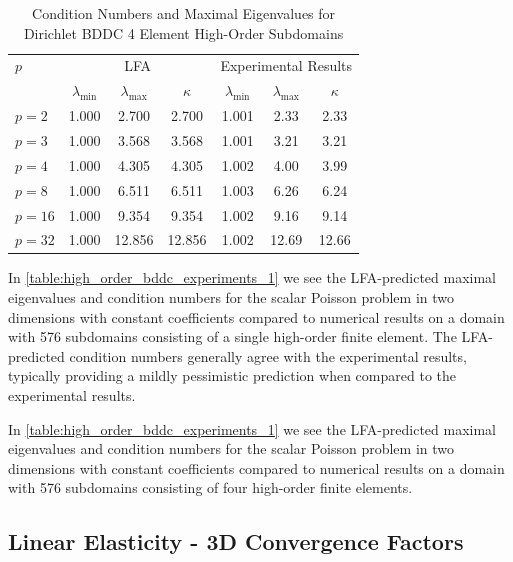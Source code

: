 \documentclass[review]{siamart190516}
\begin{document}
\begin{table}[ht!]
\begin{center}
\begin{tabular}{l ccc ccc}
  \toprule
  $p$  &  \multicolumn{3}{c}{LFA}  &  \multicolumn{3}{c}{Experimental Results}  \\
                      &  $\lambda_{\text{min}}$  &  $\lambda_{\text{max}}$  &  $\kappa$ & $\lambda_{\text{min}}$  &  $\lambda_{\text{max}}$ & $\kappa$  \\
  \toprule
  $p = 2$   &  1.000  &   2.700  &   2.700  &  1.001  &   2.33  &   2.33  \\
  $p = 3$   &  1.000  &   3.568  &   3.568  &  1.001  &   3.21  &   3.21  \\
  $p = 4$   &  1.000  &   4.305  &   4.305  &  1.002  &   4.00  &   3.99  \\
  $p = 8$   &  1.000  &   6.511  &   6.511  &  1.003  &   6.26  &   6.24  \\
  $p = 16$  &  1.000  &   9.354  &   9.354  &  1.002  &   9.16  &   9.14  \\
  $p = 32$  &  1.000  &  12.856  &  12.856  &  1.002  &  12.69  &  12.66  \\
  \bottomrule
\end{tabular}
\end{center}
\caption{Condition Numbers and Maximal Eigenvalues for Dirichlet BDDC 4 Element High-Order Subdomains}
\label{table:high_order_bddc_experiments_2}
\end{table}

In \cref{table:high_order_bddc_experiments_1} we see the LFA-predicted maximal eigenvalues and condition numbers for the scalar Poisson problem in two dimensions with constant coefficients compared to numerical results on a domain with 576 subdomains consisting of a single high-order finite element.
The LFA-predicted condition numbers generally agree with the experimental results, typically providing a mildly pessimistic prediction when compared to the experimental results.

In \cref{table:high_order_bddc_experiments_1} we see the LFA-predicted maximal eigenvalues and condition numbers for the scalar Poisson problem in two dimensions with constant coefficients compared to numerical results on a domain with 576 subdomains consisting of four high-order finite elements.

\subsection{Linear Elasticity - 3D Convergence Factors}\label{sec:solidsresults}
\end{document}

